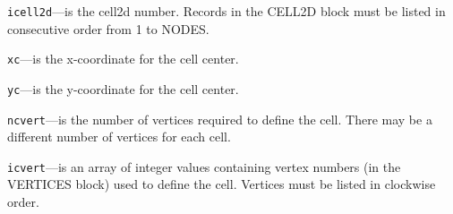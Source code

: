 \begin{description}
\item \texttt{icell2d}---is the cell2d number.  Records in the CELL2D block must be listed in consecutive order from 1 to NODES.

\item \texttt{xc}---is the x-coordinate for the cell center.

\item \texttt{yc}---is the y-coordinate for the cell center.

\item \texttt{ncvert}---is the number of vertices required to define the cell.  There may be a different number of vertices for each cell.

\item \texttt{icvert}---is an array of integer values containing vertex numbers (in the VERTICES block) used to define the cell.  Vertices must be listed in clockwise order.

\end{description}

